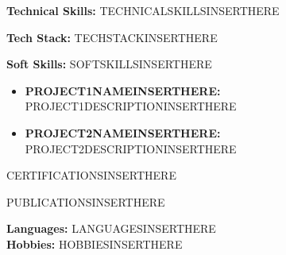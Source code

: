 \documentclass[10pt]{developercv}
\begin{document}
\vspace{0.5cm}

\textbf{Technical Skills:} TECHNICALSKILLSINSERTHERE

\textbf{Tech Stack:} TECHSTACKINSERTHERE

\textbf{Soft Skills:} SOFTSKILLSINSERTHERE

\begin{itemize}[leftmargin=*]
    \item \textbf{PROJECT1NAMEINSERTHERE:} PROJECT1DESCRIPTIONINSERTHERE
    \item \textbf{PROJECT2NAMEINSERTHERE:} PROJECT2DESCRIPTIONINSERTHERE
\end{itemize}


CERTIFICATIONSINSERTHERE


PUBLICATIONSINSERTHERE


\textbf{Languages:} LANGUAGESINSERTHERE\\[0.05cm]

\textbf{Hobbies:} HOBBIESINSERTHERE
\end{document}
